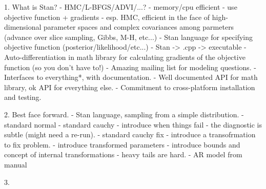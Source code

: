 


1. What is Stan?
 - HMC/L-BFGS/ADVI/...? 
   - memory/cpu efficient
	 - use objective function + gradients
	 - esp. HMC, efficient in the face of high-dimensional parameter spaces and 
	   complex covariances among parmeters (advance over slice sampling, 
		 Gibbs, M-H, etc...)
 - Stan language for specifying objective function (posterior/likelihood/etc...)
   - Stan -> .cpp -> executable
 - Auto-differentiation in math library for calculating gradients of the 
     objective function (so you don't have to!)
 - Amazing mailing list for modeling questions.
 - Interfaces to everything*, with documentation.
 - Well documented API for math library, ok API for everything else.
 - Commitment to cross-platform installation and testing.

2. Best face forward.
 - Stan language, sampling from a simple distribution.
   - standard normal
	 - standard cauchy       
	   - introduce when things fail
		 - the diagnostic is subtle (might need a re-run).
	 - standard cauchy fix   
	   - introduce a transofrmation to fix problem.
		 - introduce transformed parameters
		 - introduce bounds and concept of internal transformations
		 - heavy tails are hard.
	- AR model from manual

3.  















